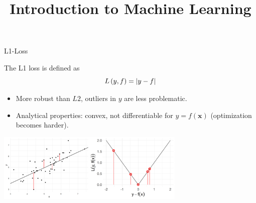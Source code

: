 \documentclass[11pt,compress,t,notes=noshow, xcolor=table]{beamer}
\title{Introduction to Machine Learning}
\institute{\href{https://compstat-lmu.github.io/lecture_i2ml/}{compstat-lmu.github.io/lecture\_i2ml}}
\date{}
\begin{document}


\begin{vbframe}{L1-Loss}

\vspace*{-0.1cm}
The L1 loss is defined as
$$
L\left(y, f\right) = \left|y-f\right|
$$

\begin{itemize}
\setlength{\itemsep}{1.5em}
\item More robust than $L2$, outliers in $y$ are less problematic.
\item Analytical properties: convex, not differentiable for $y = f(\bm{x})$ (optimization becomes harder).
\end{itemize}

\vspace*{0.2cm}

\begin{center}  \includegraphics[width = 9cm]{figure/loss_absolute_2.png} \\
\end{center}


\end{vbframe}
\end{document}
